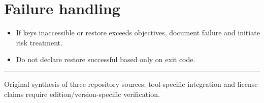 \documentclass[10pt,letterpaper]{article}
\begin{document}
\section{Failure handling}
\begin{itemize}
\item If keys inaccessible or restore exceeds objectives, document failure and initiate risk treatment.
\item Do not declare restore successful based only on exit code.
\end{itemize}
\vfill\noindent\color{muted}\rule{\linewidth}{0.4pt}\par\scriptsize Original synthesis of three repository sources; tool-specific integration and license claims require edition/version-specific verification.\normalsize
\end{document}
